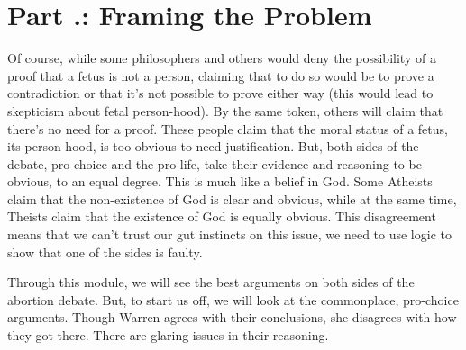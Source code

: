 \section{Part \thechapcount.\theseccount: Framing the Problem}

Of course, while some philosophers and others would deny the possibility of a proof that a fetus is not a person, claiming that to do so would be to prove a contradiction or that it's not possible to prove either way (this would lead to skepticism about fetal person-hood). By the same token, others will claim that there's no need for a proof. These people claim that the moral status of a fetus, its person-hood, is too obvious to need justification. But, both sides of the debate, pro-choice and the pro-life, take their evidence and reasoning to be obvious, to an equal degree. This is much like a belief in God. Some Atheists claim that the non-existence of God is clear and obvious, while at the same time, Theists claim that the existence of God is equally obvious. This disagreement means that we can't trust our gut instincts on this issue, we need to use logic to show that one of the sides is faulty.

Through this module, we will see the best arguments on both sides of the abortion debate. But, to start us off, we will look at the commonplace, pro-choice arguments. Though Warren agrees with their conclusions, she disagrees with how they got there. There are glaring issues in their reasoning. 


